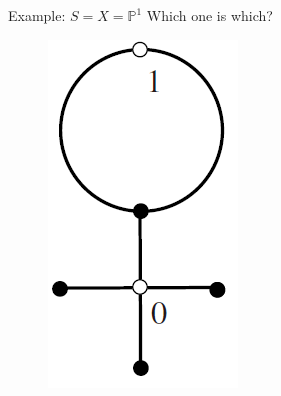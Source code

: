 \documentclass[pdf]{beamer}
\numberwithin{equation}{section}
\theoremstyle{plain}
\theoremstyle{plain}
\theoremstyle{remark}
\begin{document}
\begin{frame}{Example: $S=X=\mathbb{P}^1$}
Which one is which?
\begin{figure}[th]
	\begin{minipage}[b]{.2\textwidth}
		\centering
		\includegraphics[width=.8\textwidth]{figures/Fig4-32-1.png}
	\end{minipage}
	\begin{minipage}[b]{.2\textwidth}
	\centering

\end{minipage}
\end{figure}
\end{frame}
\end{document}

